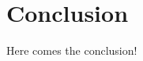 \documentclass[12pt,a4paper]{report}
\begin{document}
\chapter{Conclusion}
Here comes the conclusion!

%
%





\begin{appendices}


\end{appendices}
\end{document}
